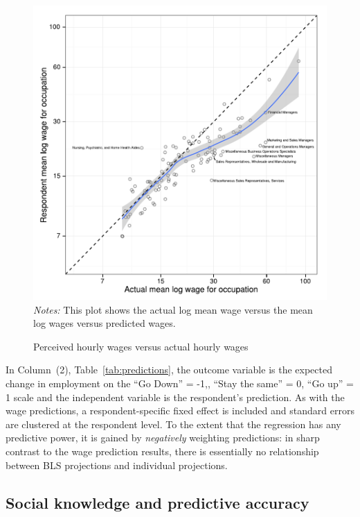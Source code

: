 \documentclass[12pt]{article}
\begin{document}
\begin{figure}
\caption{Perceived hourly wages versus actual hourly wages \label{fig:prediction_scatter}} 
\centering 
\begin{minipage}{0.90 \linewidth}
\includegraphics[width = \linewidth]{./plots/predicted_v_actual.pdf} 
\\
\emph{Notes:} This plot shows the actual log mean wage versus the mean log wages versus predicted wages.  
\end{minipage}  
\end{figure} 

In Column~(2), Table~\ref{tab:predictions}, the outcome variable is the expected change in employment on the ``Go Down'' = -1,, ``Stay the same'' = 0, ``Go up'' = 1 scale and the independent variable is the respondent's prediction. 
As with the wage predictions, a respondent-specific fixed effect is included and standard errors are clustered at the respondent level. 
To the extent that the regression has any predictive power, it is gained by \emph{negatively} weighting predictions:
in sharp contrast to the wage prediction results, there is essentially no relationship between BLS projections and individual projections. 

\subsection{Social knowledge and predictive accuracy}
\end{document}
